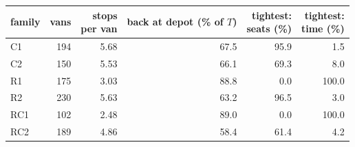 \begin{tabular}{lrrrrr}\toprule
family & vans & \shortstack{stops\\per van} & \shortstack{back at depot\\(\% of $T$)} & \shortstack{tightest:\\seats (\%)} & \shortstack{tightest:\\time (\%)} \\ \midrule
C1 & 194 & 5.68 & 67.5 & 95.9 & 1.5 \\
C2 & 150 & 5.53 & 66.1 & 69.3 & 8.0 \\
R1 & 175 & 3.03 & 88.8 & 0.0 & 100.0 \\
R2 & 230 & 5.63 & 63.2 & 96.5 & 3.0 \\
RC1 & 102 & 2.48 & 89.0 & 0.0 & 100.0 \\
RC2 & 189 & 4.86 & 58.4 & 61.4 & 4.2 \\
\bottomrule\end{tabular}
